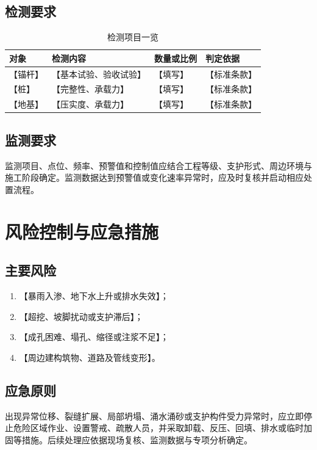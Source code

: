 \documentclass[UTF8,zihao=-4,oneside]{ctexrep}
\newcommand{\placeholder}[1]{\textcolor{documentblack}{【#1】}}
\begin{document}
\section{检测要求}
\begin{table}[H]
  \centering
  \caption{检测项目一览}
  \label{tab:test}
  \begin{tabularx}{\textwidth}{p{30mm}Xp{30mm}p{28mm}}
    \toprule
    对象 & 检测内容 & 数量或比例 & 判定依据 \\
    \midrule
    \placeholder{锚杆} & \placeholder{基本试验、验收试验} & \placeholder{填写} & \placeholder{标准条款} \\
    \placeholder{桩} & \placeholder{完整性、承载力} & \placeholder{填写} & \placeholder{标准条款} \\
    \placeholder{地基} & \placeholder{压实度、承载力} & \placeholder{填写} & \placeholder{标准条款} \\
    \bottomrule
  \end{tabularx}
\end{table}

\section{监测要求}
监测项目、点位、频率、预警值和控制值应结合工程等级、支护形式、周边环境与施工阶段确定。监测数据达到预警值或变化速率异常时，应及时复核并启动相应处置流程。

\chapter{风险控制与应急措施}

\section{主要风险}
\begin{enumerate}
  \item \placeholder{暴雨入渗、地下水上升或排水失效}；
  \item \placeholder{超挖、坡脚扰动或支护滞后}；
  \item \placeholder{成孔困难、塌孔、缩径或注浆不足}；
  \item \placeholder{周边建构筑物、道路及管线变形}。
\end{enumerate}

\section{应急原则}
出现异常位移、裂缝扩展、局部坍塌、涌水涌砂或支护构件受力异常时，应立即停止危险区域作业、设置警戒、疏散人员，并采取卸载、反压、回填、排水或临时加固等措施。后续处理应依据现场复核、监测数据与专项分析确定。
\end{document}
